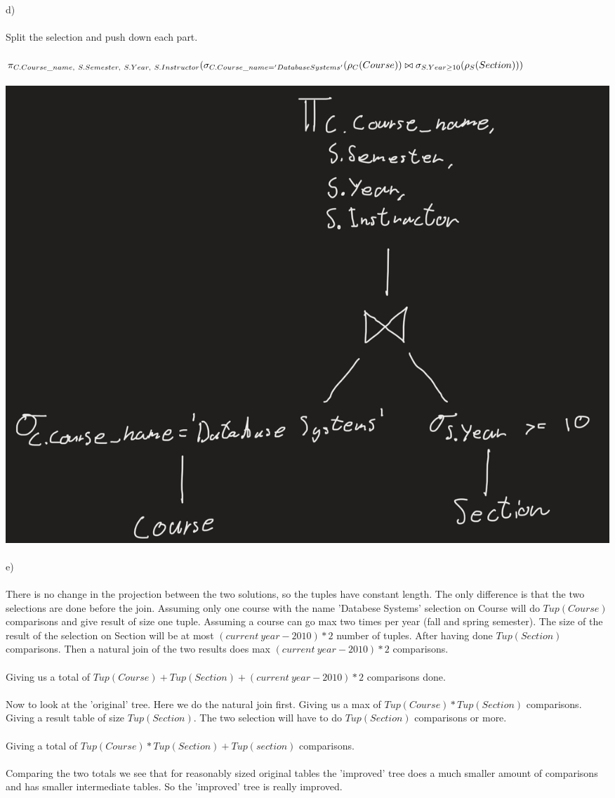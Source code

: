 \documentclass[12pt, letterpaper, twoside]{article}
\begin{document}
\\
\newpage
\ \\
d)\\
\\
Split the selection and push down each part.\\
\\
$
\pi_{C.Course\_name,\ S.Semester,\ S.Year,\ S.Instructor}(\\
\sigma_{C.Course\_name = 'Database Systems'}(\rho_C(Course)) \bowtie \sigma_{S.Year \geq 10}(\rho_S(Section)))
$\\
\\
\includegraphics[scale=0.47]{"5d.png"}\\
\\
e)\\
\\
There is no change in the projection between the two solutions, so the tuples have constant length.
The only difference is that the two selections are done before the join. Assuming only one course with the name 'Databese Systems' selection on Course will do $Tup(Course)$ comparisons and give result of size one tuple. Assuming a course can go max two times per year (fall and spring semester). The size of the result of the selection on Section will be at most $(current\ year - 2010)*2$ number of tuples. After having done $Tup(Section)$ comparisons. Then a natural join of the two results does max $(current\ year - 2010)*2$ comparisons.\\
\\
Giving us a total of $Tup(Course) + Tup(Section) + (current\ year - 2010)*2$ comparisons done.\\
\\
Now to look at the 'original' tree. Here we do the natural join first. Giving us a max of $Tup(Course) * Tup(Section)$ comparisons. Giving a result table of size $Tup(Section)$. The two selection will have to do $Tup(Section)$ comparisons or more.\\
\\
Giving a total of $Tup(Course) * Tup(Section) + Tup(section)$ comparisons.\\
\\
Comparing the two totals we see that for reasonably sized original tables the 'improved' tree does a much smaller amount of comparisons and has smaller intermediate tables. So the 'improved' tree is really improved.  
\end{document}
